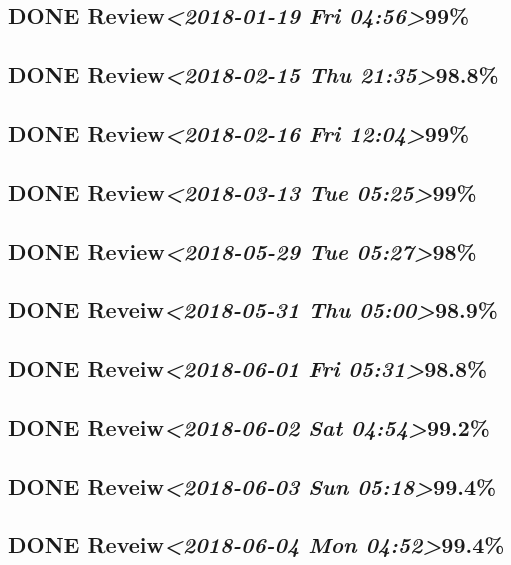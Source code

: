 \documentclass[11pt]{ctexart}
\begin{document}
\subsection{{\bfseries\sffamily DONE} Review\textit{<2018-01-19 Fri 04:56>}99\%}
\label{sec:orgefda827}
\subsection{{\bfseries\sffamily DONE} Review\textit{<2018-02-15 Thu 21:35>}98.8\%}
\label{sec:orga8e46f6}
\subsection{{\bfseries\sffamily DONE} Review\textit{<2018-02-16 Fri 12:04>}99\%}
\label{sec:org4f89af9}
\subsection{{\bfseries\sffamily DONE} Review\textit{<2018-03-13 Tue 05:25>}99\%}
\label{sec:org3c705ba}
\subsection{{\bfseries\sffamily DONE} Review\textit{<2018-05-29 Tue 05:27>}98\%}
\label{sec:orge2486a0}
\subsection{{\bfseries\sffamily DONE} Reveiw\textit{<2018-05-31 Thu 05:00>}98.9\%}
\label{sec:org62c62d9}
\subsection{{\bfseries\sffamily DONE} Reveiw\textit{<2018-06-01 Fri 05:31>}98.8\%}
\label{sec:orgbf2d54f}
\subsection{{\bfseries\sffamily DONE} Reveiw\textit{<2018-06-02 Sat 04:54>}99.2\%}
\label{sec:org8303c94}
\subsection{{\bfseries\sffamily DONE} Reveiw\textit{<2018-06-03 Sun 05:18>}99.4\%}
\label{sec:org9eb78e5}
\subsection{{\bfseries\sffamily DONE} Reveiw\textit{<2018-06-04 Mon 04:52>}99.4\%}
\label{sec:org72c9e79}
\end{document}
